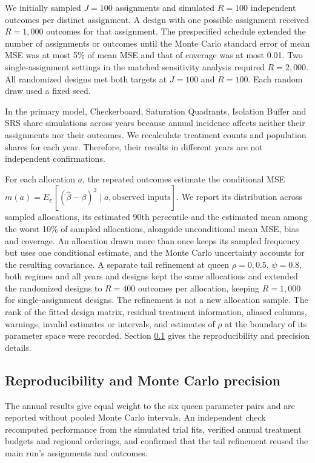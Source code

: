\documentclass[11pt]{article}
\begin{document}
We initially sampled $J=100$ assignments and simulated $R=100$
independent outcomes per distinct assignment. A design with one possible
assignment received $R=1,000$ outcomes for that assignment. The
prespecified schedule extended the number of assignments or outcomes
until the Monte Carlo standard error of mean MSE was at most 5\% of mean
MSE and that of coverage was at most 0.01. Two single-assignment settings
in the matched sensitivity analysis required $R=2,000$. All randomized
designs met both targets at $J=100$ and $R=100$. Each random draw used a
fixed seed.

In the primary model, Checkerboard, Saturation Quadrants, Isolation
Buffer and SRS share simulations across years because annual incidence
affects neither their assignments nor their outcomes. We recalculate
treatment counts and population shares for each year. Therefore, their
results in different years are not independent confirmations.

For each allocation $a$, the repeated outcomes estimate the conditional MSE \(m(a)=E_{\boldsymbol{\varepsilon}}[(\hat\beta-\beta)^2\mid a,\text{observed inputs}]\). We report its distribution across sampled allocations, its estimated 90th percentile and the estimated mean among the worst 10\% of sampled allocations, alongside unconditional mean MSE, bias and coverage. An allocation drawn more than once keeps its sampled frequency but uses one conditional estimate, and the Monte Carlo uncertainty accounts for the resulting covariance. A separate tail refinement at queen $\rho=0,0.5$, $\psi=0.8$, both regimes and all years and designs kept the same allocations and extended the randomized designs to $R=400$ outcomes per allocation, keeping $R=1,000$ for single-assignment designs. The refinement is not a new allocation sample. The rank of the fitted design matrix, residual treatment information, aliased columns, warnings, invalid estimates or intervals, and estimates of $\rho$ at the boundary of its parameter space were recorded. Section
\ref{app:nc} gives the reproducibility and precision details.


\subsection{Reproducibility and Monte Carlo precision}\label{app:nc}


The annual results give equal weight to the six queen parameter pairs
and are reported without pooled Monte Carlo intervals. An independent
check recomputed performance from the simulated trial fits, verified
annual treatment budgets and regional orderings, and confirmed that the
tail refinement reused the main run's assignments and outcomes.
\end{document}
